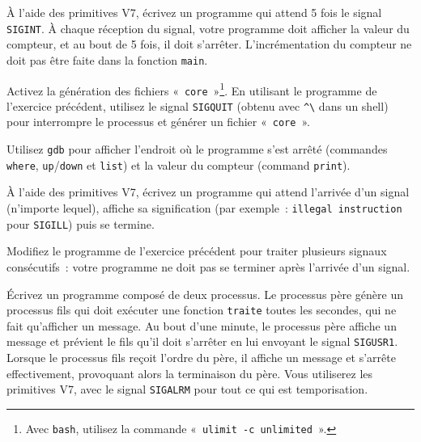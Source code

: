 %


% 


\question

À l'aide des primitives V7, écrivez un programme qui attend 5 fois
le signal \texttt {SIGINT}. À chaque réception du signal, votre
programme doit afficher la valeur du compteur, et au bout de 5 fois,
il doit s'arrêter. L'incrémentation du compteur ne doit pas être
faite dans la fonction \texttt {main}.


\question

Activez la génération des fichiers «~\texttt {core}~»\footnote
{Avec \texttt {bash}, utilisez la commande «~\texttt {ulimit -c
unlimited}~».}.  En utilisant le programme de l'exercice
précédent, utilisez le signal \texttt {SIGQUIT} (obtenu avec \texttt
{\^{}\textbackslash} dans un shell) pour interrompre le processus et
générer un fichier «~\texttt {core}~».

Utilisez \texttt {gdb} pour afficher l'endroit où le programme s'est
arrêté (commandes \texttt {where}, \texttt {up}/\texttt {down} et
\texttt {list}) et la valeur du compteur (command \texttt {print}).


\question

À l'aide des primitives V7, écrivez un programme qui attend l'arrivée
d'un signal (n'importe lequel), affiche sa signification (par
exemple~:  {\tt illegal instruction} pour {\tt SIGILL}) puis se
termine.


\question

Modifiez le programme de l'exercice précédent pour traiter plusieurs
signaux consécutifs~: votre programme ne doit pas se terminer après
l'arrivée d'un signal.


\question

Écrivez un programme composé de deux processus.  Le processus père
génère un processus fils qui doit exécuter une fonction {\tt traite}
toutes les secondes, qui ne fait qu'afficher un message.  Au bout d'une
minute, le processus père affiche un message et prévient le fils qu'il
doit s'arrêter en lui envoyant le signal \texttt {SIGUSR1}. Lorsque
le processus fils reçoit l'ordre du père, il affiche un message et
s'arrête effectivement, provoquant alors la terminaison du père. Vous
utiliserez les primitives V7, avec le signal \texttt {SIGALRM} pour tout
ce qui est temporisation.


